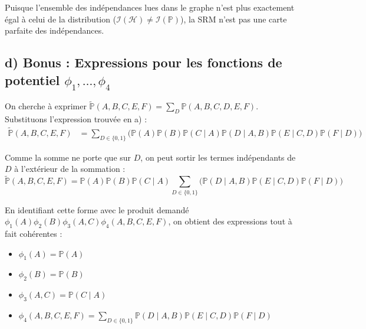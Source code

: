 \documentclass{article}
\begin{document}
Puisque l'ensemble des indépendances lues dans le graphe n'est plus exactement égal à celui de la distribution ($\mathcal{I}(\mathcal{H}) \neq \mathcal{I}(\mathbb{P})$), la SRM n'est pas une carte parfaite des indépendances.

\subsection*{d) Bonus : Expressions pour les fonctions de potentiel $\phi_1, \dots, \phi_4$}

On cherche à exprimer $\tilde{\mathbb{P}}(A, B, C, E, F) = \sum_{D} \mathbb{P}(A, B, C, D, E, F)$. 
Substituons l'expression trouvée en a) :
\begin{align*}
\tilde{\mathbb{P}}(A, B, C, E, F) &= \sum_{D \in \{0,1\}} \Big( \mathbb{P}(A)\mathbb{P}(B)\mathbb{P}(C \mid A)\mathbb{P}(D \mid A, B)\mathbb{P}(E \mid C, D)\mathbb{P}(F \mid D) \Big)
\end{align*}

Comme la somme ne porte que sur $D$, on peut sortir les termes indépendants de $D$ à l'extérieur de la sommation :
\[ \tilde{\mathbb{P}}(A, B, C, E, F) = \mathbb{P}(A)\mathbb{P}(B)\mathbb{P}(C \mid A) \sum_{D \in \{0,1\}} \Big( \mathbb{P}(D \mid A, B)\mathbb{P}(E \mid C, D)\mathbb{P}(F \mid D) \Big) \]

En identifiant cette forme avec le produit demandé $\phi_1(A)\phi_2(B)\phi_3(A, C)\phi_4(A, B, C, E, F)$, on obtient des expressions tout à fait cohérentes :
\begin{itemize}
    \item $\phi_1(A) = \mathbb{P}(A)$
    \item $\phi_2(B) = \mathbb{P}(B)$
    \item $\phi_3(A, C) = \mathbb{P}(C \mid A)$
    \item $\phi_4(A, B, C, E, F) = \displaystyle \sum_{D \in \{0,1\}} \mathbb{P}(D \mid A, B)\mathbb{P}(E \mid C, D)\mathbb{P}(F \mid D)$
\end{itemize}
\end{document}
